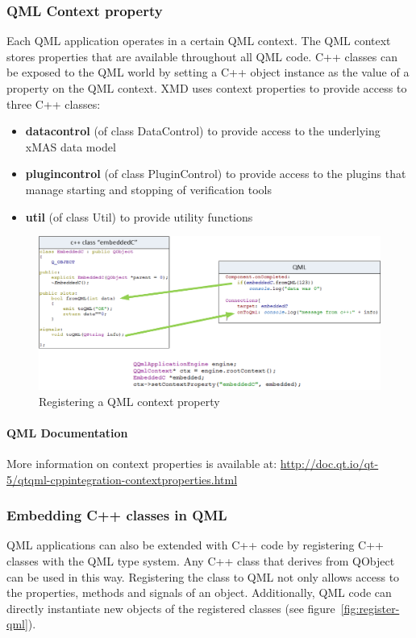\subsubsection{QML Context property}
Each QML application operates in a certain QML context. The QML context stores
properties that are available throughout all QML code. C++ classes can be exposed
to the QML world by setting a C++ object instance as the value of a property
on the QML context.
XMD uses context properties to provide access to three C++ classes:

\begin{itemize}
 \item \textbf{datacontrol} (of class DataControl) to provide access to the
 underlying xMAS data model
 \item \textbf{plugincontrol} (of class PluginControl) to provide access to
 the plugins that manage starting and stopping of verification tools
 \item \textbf{util} (of class Util) to provide utility functions
\end{itemize}

\begin{figure}
    \includegraphics[width=\textwidth]{qml3}
    \caption{Registering a QML context property}
\end{figure}

\paragraph{QML Documentation}
More information on context properties is available at:
\url{http://doc.qt.io/qt-5/qtqml-cppintegration-contextproperties.html}


\subsubsection{Embedding C++ classes in QML}

QML applications can also be extended with C++ code by registering C++ classes
with the QML type system. Any C++ class that derives from QObject can be used
in this way. Registering the class to QML not only allows access to the properties,
methods and signals of an object. Additionally, QML code can directly instantiate
new objects of the registered classes (see figure~\ref{fig:register-qml}).

